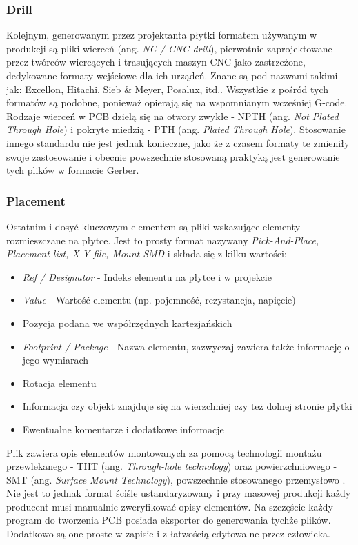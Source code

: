 \documentclass{xmgr}
\begin{document}
\subsubsection {Drill}
Kolejnym, generowanym przez projektanta płytki formatem używanym w produkcji są pliki wierceń (ang. \emph{NC / CNC drill}), pierwotnie zaprojektowane przez twórców wiercących i trasujących maszyn CNC jako zastrzeżone, dedykowane formaty wejściowe dla ich urządeń. Znane są pod nazwami takimi jak: Excellon, Hitachi, Sieb \& Meyer, Posalux, itd.\cite{Charras}. Wszystkie z pośród tych formatów są podobne, ponieważ opierają się na wspomnianym wcześniej G-code. Rodzaje wierceń w PCB dzielą się na otwory zwykłe - NPTH (ang. \emph{Not Plated Through Hole}) i pokryte miedzią - PTH (ang. \emph{Plated Through Hole})\cite{voldman}. Stosowanie innego standardu nie jest jednak konieczne, jako że z czasem formaty te zmieniły swoje zastosowanie i obecnie powszechnie stosowaną praktyką jest generowanie tych plików w formacie Gerber.

\subsubsection {Placement}
Ostatnim i dosyć kluczowym elementem są pliki wskazujące elementy rozmieszczane na płytce. Jest to prosty format nazywany \emph {Pick-And-Place, Placement list, X-Y file, Mount SMD}  i składa się z kilku wartości:
\begin{itemize}
\item \emph{Ref / Designator} - Indeks elementu na płytce i w projekcie
\item \emph{Value} - Wartość elementu (np. pojemność, rezystancja, napięcie)
\item Pozycja podana we współrzędnych kartezjańskich
\item \emph{Footprint / Package} - Nazwa elementu, zazwyczaj zawiera także informację o jego wymiarach
\item Rotacja elementu
\item Informacja czy objekt znajduje się na wierzchniej czy też dolnej stronie płytki
\item Ewentualne komentarze i dodatkowe informacje
\end{itemize}
Plik zawiera opis elementów montowanych za pomocą technologii montażu przewlekanego - THT (ang. \emph{Through-hole technology}) oraz powierzchniowego - SMT (ang. \emph{Surface Mount Technology}), powszechnie stosowanego przemysłowo \cite {prasad}. Nie jest to jednak format ściśle ustandaryzowany i przy masowej produkcji każdy producent musi manualnie zweryfikować opisy elementów. Na szczęście każdy program do tworzenia PCB posiada eksporter do generowania tychże plików. Dodatkowo są one proste w zapisie i z łatwością edytowalne przez człowieka.
\end{document}
